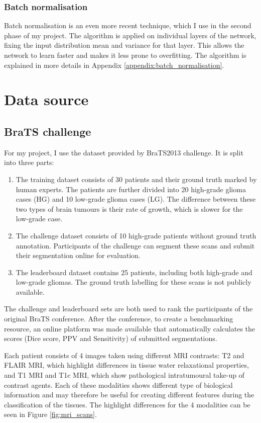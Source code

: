 \documentclass[12pt,a4paper,twoside,openright]{report}
\begin{document}
\subsubsection{Batch normalisation}
Batch normalisation \cite{batch_normalization} is an even more recent technique, which I use in the second phase of my project. The algorithm is applied on individual layers of the network, fixing the input distribution mean and variance for that layer. This allows the network to learn faster and makes it less prone to overfitting. The algorithm is explained in more details in Appendix \ref{appendix:batch_normalisation}.

\section{Data source}
\subsection{BraTS challenge}
For my project, I use the dataset provided by BraTS2013\cite{menze:hal-00935640} challenge. It is split into three parts:
\begin{enumerate}
	\item The training dataset consists of 30 patients and their ground truth marked by human experts. The patients are further divided into 20 high-grade glioma cases (HG) and 10 low-grade glioma cases (LG). The difference between these two types of brain tumours is their rate  of growth, which is slower for the low-grade case.
	\item The challenge dataset consists of 10 high-grade patients without ground truth annotation. Participants of the challenge can segment these scans and submit their segmentation online for evaluation. 	
	\item The leaderboard dataset contains 25 patients, including both high-grade and low-grade gliomas. The ground truth labelling for these scans is not publicly available.
\end{enumerate}
The challenge and leaderboard sets are both used to rank the participants of the original BraTS conference. After the conference, to create a benchmarking resource, an online platform was made available that automatically calculates the scores (Dice score, PPV and Sensitivity) of submitted segmentations.

Each patient consists of 4 images taken using different MRI contrasts: T2 and FLAIR MRI, which highlight differences in tissue water relaxational properties, and T1 MRI and T1c MRI, which show pathological intratumoural take-up of contrast agents. Each of these modalities shows different type of biological information and may therefore be useful for creating different features during the classification of the tissues. The highlight differences for the 4 modalities can be seen in Figure \ref{fig:mri_scans}. 
\end{document}
